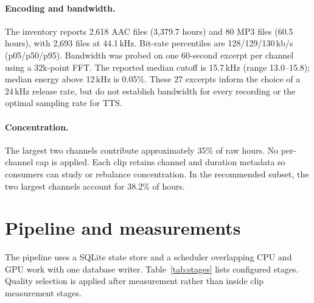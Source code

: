 \documentclass[11pt,a4paper]{article}
\begin{document}
\paragraph{Encoding and bandwidth.}
The inventory reports 2,618 AAC files (3,379.7 hours) and 80 MP3 files
(60.5 hours), with 2,693 files at 44.1\,kHz. Bit-rate percentiles are
128/129/130\,kb/s (p05/p50/p95). Bandwidth was probed on one 60-second
excerpt per channel using a 32k-point FFT. The reported median cutoff is
15.7\,kHz (range 13.0--15.8); median energy above 12\,kHz is 0.05\%.
These 27 excerpts inform the choice of a 24\,kHz release rate, but do not
establish bandwidth for every recording or the optimal sampling rate for TTS.

\paragraph{Concentration.}
The largest two channels contribute approximately 35\% of raw hours. No
per-channel cap is applied. Each clip retains channel and duration metadata
so consumers can study or rebalance concentration. In the recommended subset,
the two largest channels account for 38.2\% of hours.

\section{Pipeline and measurements}
\label{sec:pipeline}
\label{sec:measurements}
The pipeline uses a SQLite state store and a scheduler overlapping CPU and
GPU work with one database writer. Table~\ref{tab:stages} lists configured
stages. Quality selection is applied after measurement rather than inside
clip measurement stages.
\end{document}

